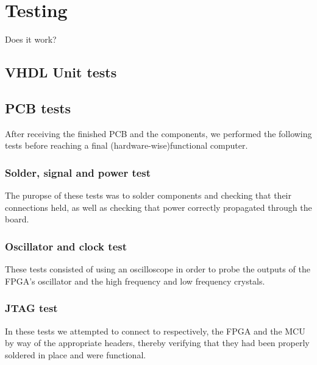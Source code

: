 \chapter{Testing}

Does it work?

\section{VHDL Unit tests}




\section{PCB tests}

After receiving the finished PCB and the components, we performed the following tests before reaching a final (hardware-wise)functional computer.   

\subsection{Solder, signal and power test}
The puropse of these tests was to solder components and checking that their connections held, as well as checking that power correctly propagated through the board.  


\subsection{Oscillator and clock test}
These tests consisted of using an oscilloscope in order to probe the outputs of the FPGA's oscillator and the high frequency and low frequency crystals.


\subsection{JTAG test}
In these tests we attempted to connect to respectively, the FPGA and the MCU by way of the appropriate headers, thereby verifying that they had been properly soldered in place and were functional.

